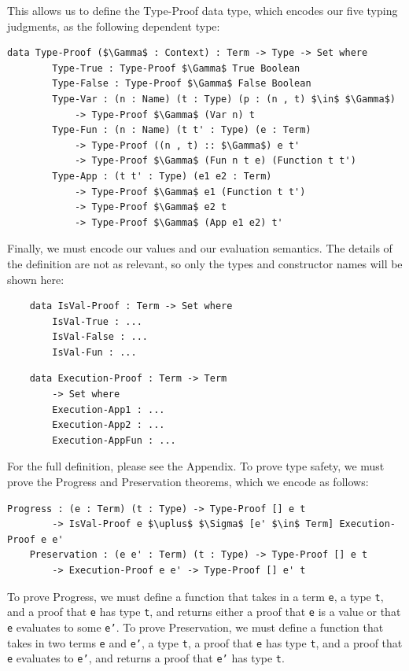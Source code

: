 \documentclass[12pt, letterpaper]{article}
\begin{document}
This allows us to define the Type-Proof data type, which encodes our five typing judgments, as the following dependent type:
\begin{Verbatim}[mathescape,commandchars=\\\{\}]
	data Type-Proof ($\Gamma$ : Context) : Term -> Type -> Set where
		Type-True : Type-Proof $\Gamma$ True Boolean
		Type-False : Type-Proof $\Gamma$ False Boolean
		Type-Var : (n : Name) (t : Type) (p : (n , t) $\in$ $\Gamma$) 
			-> Type-Proof $\Gamma$ (Var n) t
		Type-Fun : (n : Name) (t t' : Type) (e : Term) 
			-> Type-Proof ((n , t) :: $\Gamma$) e t' 
			-> Type-Proof $\Gamma$ (Fun n t e) (Function t t')
		Type-App : (t t' : Type) (e1 e2 : Term) 
			-> Type-Proof $\Gamma$ e1 (Function t t') 
			-> Type-Proof $\Gamma$ e2 t 
			-> Type-Proof $\Gamma$ (App e1 e2) t'
\end{Verbatim}
Finally, we must encode our values and our evaluation semantics. The details of the definition are not as relevant, so only the types and constructor names will be shown here:
\begin{multicols}{2}
\begin{Verbatim}
	data IsVal-Proof : Term -> Set where
		IsVal-True : ...
		IsVal-False : ...
		IsVal-Fun : ...
\end{Verbatim}
\begin{Verbatim}
	data Execution-Proof : Term -> Term 
		-> Set where
		Execution-App1 : ...
    	Execution-App2 : ...
		Execution-AppFun : ... 
\end{Verbatim}
\end{multicols}
For the full definition, please see the Appendix. To prove type safety, we must prove the Progress and Preservation theorems, which we encode as follows:
\begin{Verbatim}[mathescape,commandchars=\\\{\}]
	Progress : (e : Term) (t : Type) -> Type-Proof [] e t 
		-> IsVal-Proof e $\uplus$ $\Sigma$ [e' $\in$ Term] Execution-Proof e e'
	Preservation : (e e' : Term) (t : Type) -> Type-Proof [] e t 
		-> Execution-Proof e e' -> Type-Proof [] e' t
\end{Verbatim}
To prove Progress, we must define a function that takes in a term \texttt{e}, a type \texttt{t}, and a proof that \texttt{e} has type \texttt{t}, and returns either a proof that \texttt{e} is a value or that \texttt{e} evaluates to some \texttt{e'}. To prove Preservation, we must define a function that takes in two terms \texttt{e} and \texttt{e'}, a type \texttt{t}, a proof that \texttt{e} has type \texttt{t}, and a proof that \texttt{e} evaluates to \texttt{e'}, and returns a proof that \texttt{e'} has type \texttt{t}.
\end{document}
